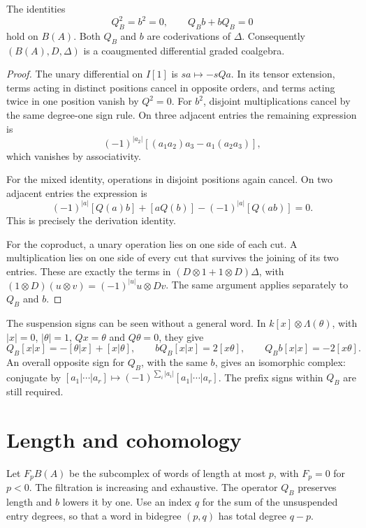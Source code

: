 \begin{proposition}
\label{prop:brst-signed-bar}
The identities
\[
 Q_B^2=b^2=0,
 \qquad Q_Bb+bQ_B=0
\]
hold on $B(A)$.
Both $Q_B$ and $b$ are coderivations of $\Delta$.
Consequently $(B(A),D,\Delta)$ is a coaugmented differential graded
coalgebra.
\end{proposition}
\begin{proof}
The unary differential on $I[1]$ is $s a\mapsto-sQa$.
In its tensor extension, terms acting in distinct positions cancel
in opposite orders, and terms acting twice in one position vanish
by $Q^2=0$.
For $b^2$, disjoint multiplications cancel by the same degree-one
sign rule.  On three adjacent entries the remaining expression is
\[
 (-1)^{|a_2|}
 [(a_1a_2)a_3-a_1(a_2a_3)],
\]
which vanishes by associativity.

For the mixed identity, operations in disjoint positions again
cancel.  On two adjacent entries the expression is
\[
 (-1)^{|a|}[Q(a)b]+[aQ(b)]-(-1)^{|a|}[Q(ab)]=0.
\]
This is precisely the derivation identity.

For the coproduct, a unary operation lies on one side of each cut.
A multiplication lies on one side of every cut that survives the
joining of its two entries.
These are exactly the terms in
$(D\otimes1+1\otimes D)\Delta$, with
$(1\otimes D)(u\otimes v)=(-1)^{|u|}u\otimes Dv$.
The same argument applies separately to $Q_B$ and $b$.
\end{proof}

The suspension signs can be seen without a general word.
In $k[x]\otimes\Lambda(\theta)$, with $|x|=0$, $|\theta|=1$,
$Qx=\theta$ and $Q\theta=0$, they give
\[
 Q_B[x|x]=-[\theta|x]+[x|\theta],
 \qquad
 bQ_B[x|x]=2[x\theta],
 \qquad Q_Bb[x|x]=-2[x\theta].
\]
An overall opposite sign for $Q_B$, with the same $b$, gives
an isomorphic complex: conjugate by
$[a_1|\cdots|a_r]\mapsto(-1)^{\sum_i|a_i|}[a_1|\cdots|a_r]$.
The prefix signs within $Q_B$ are still required.

\section{Length and cohomology}
Let $F_pB(A)$ be the subcomplex of words of length at most $p$,
with $F_p=0$ for $p<0$.
The filtration is increasing and exhaustive.
The operator $Q_B$ preserves length and $b$ lowers it by one.
Use an index $q$ for the sum of the unsuspended entry degrees,
so that a word in bidegree $(p,q)$ has total degree $q-p$.

